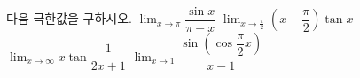 다음 극한값을 구하시오.
 $\displaystyle\lim_{x\to\pi}\dfrac{\sin x}{\pi-x}$
 $\displaystyle\lim_{x\to\frac{\pi}{2}}\left(x-\dfrac{\pi}{2}\right)\tan x$
 $\displaystyle\lim_{x\to\infty}x\tan\dfrac{1}{2x+1}$
 $\displaystyle\lim_{x\to 1}\dfrac{\sin\left(\cos\dfrac{\pi}{2}x\right)}{x-1}$
